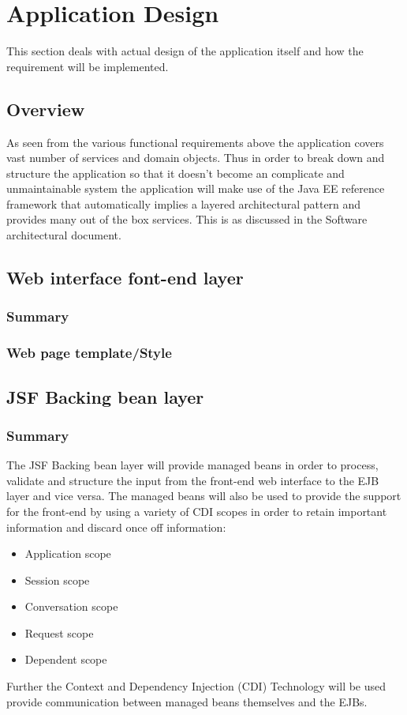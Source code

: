 \documentclass[12pt]{article}
\begin{document}
\section{Application Design}
This section deals with actual design of the application itself and how the requirement will be implemented.
\subsection{Overview}
As seen from the various functional requirements above the application covers vast number of services and domain objects. Thus in order to break down and structure the application so that it doesn't become an complicate and unmaintainable system the application will make use of the Java EE reference framework that automatically implies a layered architectural pattern and provides many out of the box services. This is as discussed in the Software architectural document.

\newpage
\subsection{Web interface font-end layer}
\subsubsection{Summary}

\subsubsection{Web page template/Style}

\newpage
\subsection{JSF Backing bean layer}
\subsubsection{Summary}
The JSF Backing bean layer will provide managed beans in order to process, validate and structure the input from the front-end web interface to the EJB layer and vice versa. The managed beans will also be used to provide the support for the front-end by using a variety of CDI scopes in order to retain important information and discard once off information:
\begin{itemize}
	\item Application scope
	\item Session scope
	\item Conversation scope
	\item Request scope
	\item Dependent scope
\end{itemize}
Further the Context and Dependency Injection (CDI) Technology will be used provide communication between managed beans themselves and the EJBs.
\end{document}
